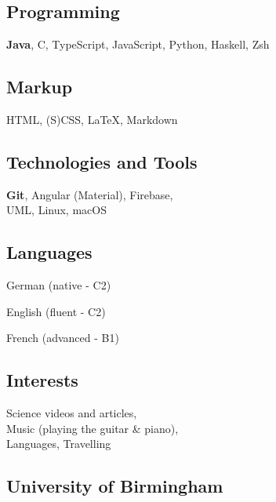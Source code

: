 \documentclass[]{jonas-cv}
\begin{document}
\begin{minipage}[t]{0.33\textwidth} 


\tinysectionsep
\subsection{Programming}
\textbf{Java}, C, TypeScript, JavaScript, Python, Haskell, Zsh
\sectionsep

\subsection{Markup}
HTML, (S)CSS, \LaTeX, Markdown
\sectionsep

\subsection{Technologies and Tools}
\textbf{Git}, Angular (Material), Firebase, \\UML, Linux, macOS
\sectionsep

\subsection{Languages}
\tinysectionsep
\tinysectionsep
\begin{tightemize}
    \item German (native - C2)
    \item English (fluent - C2)
    \item French (advanced - B1)
\end{tightemize}
\sectionsep 

\subsection{Interests}
Science videos and articles,\\
Music (playing the guitar \& piano),\\
Languages, Travelling
\largesectionsep

\vspace{1mm}

\tinysectionsep
\vspace{0.25mm}
\subsection{University of Birmingham}
\sectionsep


\end{minipage}
\end{document}
